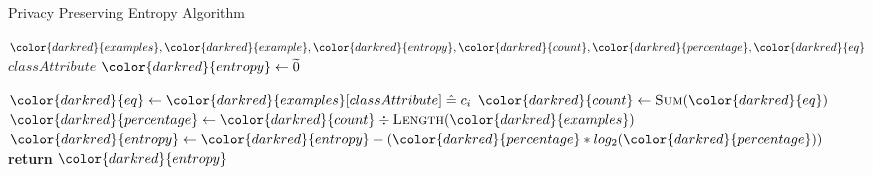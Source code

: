 \begin{algorithm}[H]
\caption{Privacy Preserving Entropy Algorithm}\label{a:id3-Entropy-pp}
\begin{algorithmic}[1]
\Require ${\color{darkred}{examples}}, {\color{darkred}{example}}, {\color{darkred}{entropy}}, {\color{darkred}{count}}, {\color{darkred}{percentage}}, {\color{darkred}{eq}}$
\renewcommand{\algorithmicrequire}{\textbf{Global Vars:}}
\Require $classAttribute$
    \State ${\color{darkred}{entropy}} \gets \enc{0}$

        \State ${\color{darkred}{eq}} \gets {\color{darkred}{examples}}[classAttribute] \heq c_i$ 
        \State ${\color{darkred}{count}} \gets \textsc{Sum}({\color{darkred}{eq}})$
        \State ${\color{darkred}{percentage}} \gets {\color{darkred}{count}} \div \textsc{Length}({\color{darkred}{examples}})$
        \State ${\color{darkred}{entropy}} \gets {\color{darkred}{entropy}} - ({\color{darkred}{percentage}} * log_2 ({\color{darkred}{percentage}}))$
    \EndFor
    \State \textbf{return} ${\color{darkred}{entropy}}$
\EndProcedure
\end{algorithmic}
\end{algorithm}
